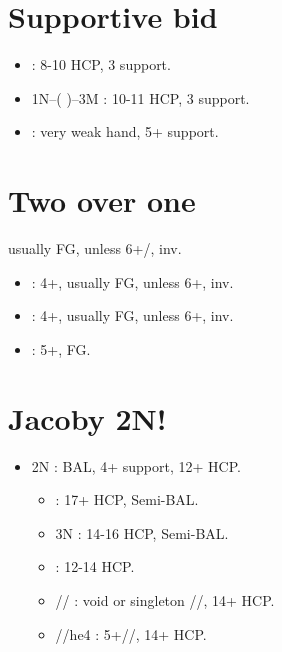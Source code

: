 \documentclass[12pt,twoside,a5paper]{report}%
\begin{document}
	\section*{Supportive bid}
		\begin{itemize}
		\renewcommand{\labelitemi}{}
		\item {} : 8-10 HCP, 3\sp{} support.
		\item 1N--( )--3M : 10-11 HCP, 3\sp{} support.
		\item {} : very weak hand, 5+\sp{} support.
		\end{itemize}

	\section*{Two over one}
		usually FG, unless 6+\cl{}/\di{}, inv.
		\begin{itemize}
		\renewcommand{\labelitemi}{}
		\item {} : 4+\cl{}, usually FG, unless 6+\cl{}, inv.
		\item {} : 4+\di{}, usually FG, unless 6+\di{}, inv.
		\item {} : 5+\he{}, FG.
		\end{itemize}
	
	\section*{Jacoby 2N!}
		\begin{itemize}
		\renewcommand{\labelitemi}{}
		\item 2N : BAL, 4+\sp{} support, 12+ HCP.
			\begin{itemize}
			\renewcommand{\labelitemi}{--}
			\item {} : 17+ HCP, Semi-BAL.
			\item 3N : 14-16 HCP, Semi-BAL.
			\item {} : 12-14 HCP.
			\item {}// : void or singleton //, 14+ HCP.
			\item {}//he{4} : 5+//, 14+ HCP.
			\end{itemize}
		\end{itemize}
\end{document}
